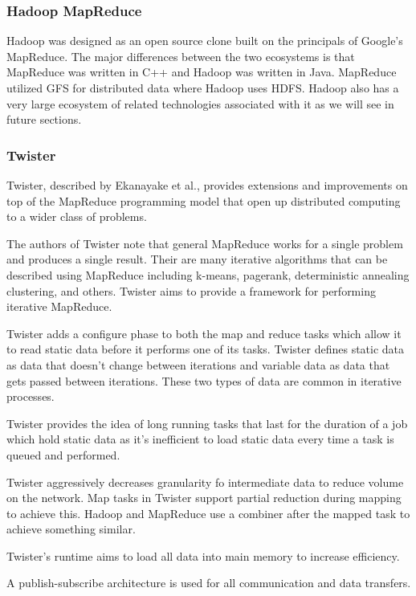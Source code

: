\documentclass[]{article}
\begin{document}
\subsubsection{Hadoop MapReduce}
Hadoop\cite{white2012hadoop} was designed as an open source clone built on the principals of Google's MapReduce. The major differences between the two ecosystems is that MapReduce was written in C++ and Hadoop was written in Java. MapReduce utilized GFS for distributed data where Hadoop uses HDFS. Hadoop also has a very large ecosystem of related technologies associated with it as we will see in future sections.

\subsubsection{Twister}
Twister, described by Ekanayake et al.\cite{ekanayake2010twister}, provides extensions and improvements on top of the MapReduce programming model that open up distributed computing to a wider class of problems. 

The authors of Twister note that general MapReduce works for a single problem and produces a single result. Their are many iterative algorithms that can be described using MapReduce including k-means, pagerank, deterministic annealing clustering, and others. Twister aims to provide a framework for performing iterative MapReduce.

Twister adds a configure phase to both the map and reduce tasks which allow it to read static data before it performs one of its tasks. Twister defines static data as data that doesn't change between iterations and variable data as data that gets passed between iterations. These two types of data are common in iterative processes.

Twister provides the idea of long running tasks that last for the duration of a job which hold static data as it's inefficient to load static data every time a task is queued and performed.

Twister aggressively decreases granularity fo intermediate data to reduce volume on the network. Map tasks in Twister support partial reduction during mapping to achieve this. Hadoop and MapReduce use a combiner after the mapped task to achieve something similar.

Twister's runtime aims to load all data into main memory to increase efficiency.

A publish-subscribe architecture is used for all communication and data transfers.
\end{document}
